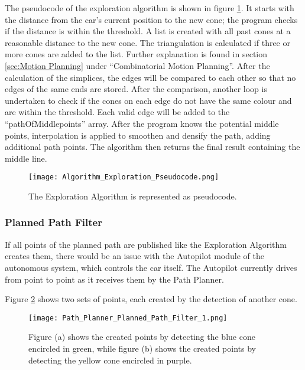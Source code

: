 The pseudocode of the exploration algorithm is shown in figure \ref{fig:Algorithm Exploration Pseudocode}. It starts with the distance from the car's current position to the new cone; the program checks if the distance is within the threshold. A list is created with all past cones at a reasonable distance to the new cone. The triangulation is calculated if three or more cones are added to the list. Further explanation is found in section \ref{sec:Motion Planning} under ``Combinatorial Motion Planning''. After the calculation of the simplices, the edges will be compared to each other so that no edges of the same ends are stored. After the comparison, another loop is undertaken to check if the cones on each edge do not have the same colour and are within the threshold. Each valid edge will be added to the ``pathOfMiddlepoints'' array. After the program knows the potential middle points, interpolation is applied to smoothen and densify the path, adding additional path points. The algorithm then returns the final result containing the middle line.
\begin{figure}[H]
    \centering
    \texttt{[image: Algorithm\_Exploration\_Pseudocode.png]}
    \caption{The Exploration Algorithm is represented as pseudocode.}
    \label{fig:Algorithm Exploration Pseudocode}
\end{figure}

\pagebreak

\subsubsection{Planned Path Filter} \label{sec:Planned Path Filter}
If all points of the planned path are published like the Exploration Algorithm creates them, there would be an issue with the Autopilot module of the autonomous system, which controls the car itself. The Autopilot currently drives from point to point as it receives them by the Path Planner. \cite{zur_autopilot}

Figure \ref{fig:Path Planner Planned Path Filter 1} shows two sets of points, each created by the detection of another cone.
\begin{figure}[H]
    \centering
    \texttt{[image: Path\_Planner\_Planned\_Path\_Filter\_1.png]}
    \caption{Figure (a) shows the created points by detecting the blue cone encircled in green, while figure (b) shows the created points by detecting the yellow cone encircled in purple.}
    \label{fig:Path Planner Planned Path Filter 1}
\end{figure}

